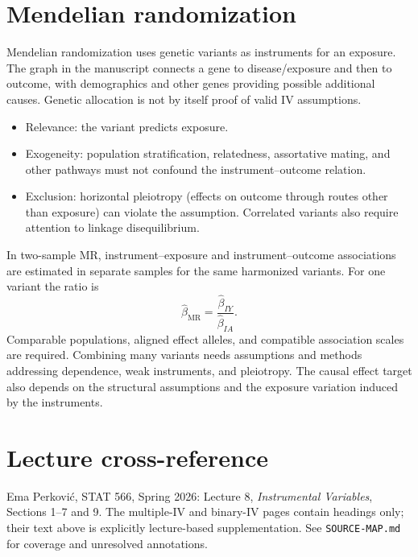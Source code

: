 \section{Mendelian randomization}
Mendelian randomization uses genetic variants as instruments for an exposure. The graph in the manuscript connects a gene to disease/exposure and then to outcome, with demographics and other genes providing possible additional causes. Genetic allocation is not by itself proof of valid IV assumptions.
\begin{itemize}
\item Relevance: the variant predicts exposure.
\item Exogeneity: population stratification, relatedness, assortative mating, and other pathways must not confound the instrument--outcome relation.
\item Exclusion: horizontal pleiotropy (effects on outcome through routes other than exposure) can violate the assumption. Correlated variants also require attention to linkage disequilibrium.
\end{itemize}
In two-sample MR, instrument--exposure and instrument--outcome associations are estimated in separate samples for the same harmonized variants. For one variant the ratio is
\begin{equation}
\widehat\beta_{\mathrm{MR}}=\frac{\widehat\beta_{IY}}{\widehat\beta_{IA}}.
\end{equation}
Comparable populations, aligned effect alleles, and compatible association scales are required. Combining many variants needs assumptions and methods addressing dependence, weak instruments, and pleiotropy. The causal effect target also depends on the structural assumptions and the exposure variation induced by the instruments.
\section*{Lecture cross-reference}
Ema Perkovi\'c, STAT 566, Spring 2026: Lecture 8, \emph{Instrumental Variables}, Sections 1--7 and 9. The multiple-IV and binary-IV pages contain headings only; their text above is explicitly lecture-based supplementation. See \texttt{SOURCE-MAP.md} for coverage and unresolved annotations.
